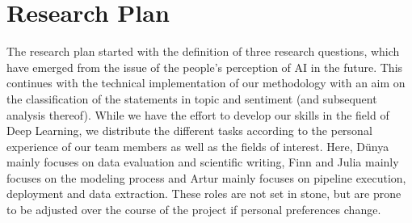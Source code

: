 \documentclass[11pt]{article}
\begin{document}
\section{Research Plan}
The research plan started with the definition of three research questions, which have emerged from the issue of the people’s perception of AI in the future.
This continues with the technical implementation of our methodology with an aim on the classification of the statements in topic and sentiment (and subsequent analysis thereof).
While we have the effort to develop our skills in the field of Deep Learning, we distribute the different tasks according to the personal experience of our team members as well as the fields of interest.
Here, Dünya mainly focuses on data evaluation and scientific writing, Finn and Julia mainly focuses on the modeling process and Artur  mainly focuses on pipeline execution, deployment and data extraction.
These roles are not set in stone, but are prone to be adjusted over the course of the project if personal preferences change.
\end{document}
